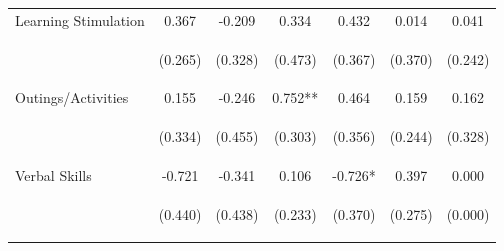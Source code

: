 \begin{tabular}{lcccccc}
\noalign{\smallskip}Learning Stimulation & 0.367 & -0.209 & 0.334 & 0.432 & 0.014 & 0.041\\
 & \begin{footnotesize}(0.265)\end{footnotesize} & \begin{footnotesize}(0.328)\end{footnotesize} & \begin{footnotesize}(0.473)\end{footnotesize} & \begin{footnotesize}(0.367)\end{footnotesize} & \begin{footnotesize}(0.370)\end{footnotesize} & \begin{footnotesize}(0.242)\end{footnotesize}\\
\noalign{\smallskip}Outings/Activities & 0.155 & -0.246 & 0.752** & 0.464 & 0.159 & 0.162\\
 & \begin{footnotesize}(0.334)\end{footnotesize} & \begin{footnotesize}(0.455)\end{footnotesize} & \begin{footnotesize}(0.303)\end{footnotesize} & \begin{footnotesize}(0.356)\end{footnotesize} & \begin{footnotesize}(0.244)\end{footnotesize} & \begin{footnotesize}(0.328)\end{footnotesize}\\
\noalign{\smallskip}Verbal Skills & -0.721 & -0.341 & 0.106 & -0.726* & 0.397 & 0.000\\
 & \begin{footnotesize}(0.440)\end{footnotesize} & \begin{footnotesize}(0.438)\end{footnotesize} & \begin{footnotesize}(0.233)\end{footnotesize} & \begin{footnotesize}(0.370)\end{footnotesize} & \begin{footnotesize}(0.275)\end{footnotesize} & \begin{footnotesize}(0.000)\end{footnotesize}\\

\end{tabular}
